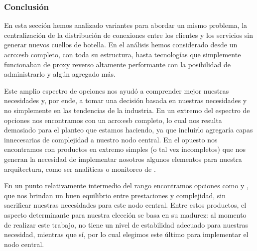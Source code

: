 \subsubsection{Conclusión}

En esta sección hemos analizado variantes para abordar un mismo problema, la centralización de la distribución de conexiones entre los clientes y los servicios sin generar nuevos cuellos de botella. En el análisis hemos considerado desde un \gls{acro:esb} completo, con toda su estructura, hasta tecnologías que simplemente funcionaban de proxy reverso altamente performante con la posibilidad de administrarlo y algún agregado más.

Este amplio espectro de opciones nos ayudó a comprender mejor nuestras necesidades y, por ende, a tomar una decisión basada en nuestras necesidades y no simplemente en las tendencias de la industria. En un extremo del espectro de opciones nos encontramos con un \gls{acro:esb} completo, lo cual nos resulta demasiado para el planteo que estamos haciendo, ya que incluirlo agregaría capas innecesarias de complejidad a nuestro nodo central. En el opuesto nos encontramos con productos en extremo simples (o tal vez incompletos) que nos generan la necesidad de implementar nosotros algunos elementos para nuestra arquitectura, como ser analíticas o monitoreo de .

En un punto relativamente intermedio del rango encontramos opciones como  y , que nos brindan un buen equilibrio entre prestaciones y complejidad, sin sacrificar nuestras necesidades para este nodo central. Entre estos productos, el aspecto determinante para nuestra elección se basa en su madurez: al momento de realizar este trabajo,  no tiene un nivel de estabilidad adecuado para nuestras necesidad, mientras que  sí, por lo cual elegimos este último para implementar el nodo central.
